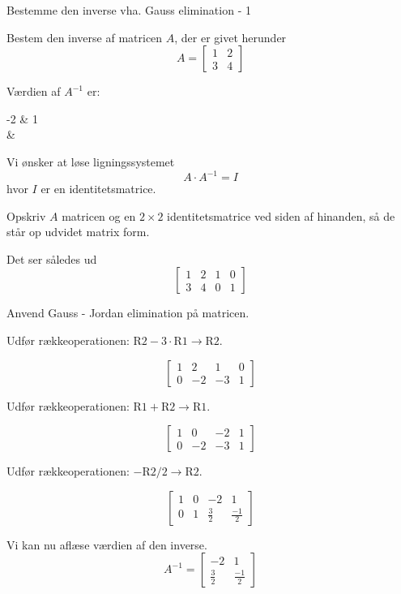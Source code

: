 \documentclass{article}
\begin{document}
\tableofcontents
\newpage

\begin{exercise}{Bestemme den inverse vha. Gauss elimination - 1}

Bestem den inverse af matricen $A$, der er givet herunder
\[
A = \left[\begin{array}{cc}
1 & 2 \\
3 & 4
\end{array} \right]
\]

Værdien af $A^{-1}$ er:
\begin{answermatrix}
-2 & 1 \\
 & 
\end{answermatrix}

\hint
Vi ønsker at løse ligningssystemet
\[
A \cdot A^{-1} = I
\]
hvor $I$ er en identitetsmatrice.

\hint
Opskriv $A$ matricen og en $2 \times 2$ identitetsmatrice
ved siden af hinanden, så de står op udvidet matrix form.

\hint
Det ser således ud
\[
\left[\begin{array}{cc|cc}
1 & 2 & 1 & 0 \\
3 & 4 & 0 & 1
\end{array} \right]
\]

\hint
Anvend Gauss - Jordan elimination på matricen.

\hint
Udfør rækkeoperationen: $\text{R2} - 3 \cdot \text{R1} \to \text{R2}$.

\hint
\[
\left[\begin{array}{cc|cc}
1 & 2 & 1 & 0 \\
0 & -2 & -3 & 1
\end{array} \right]
\]

\hint
Udfør rækkeoperationen: $\text{R1} + \text{R2} \to \text{R1}$.

\hint
\[
\left[\begin{array}{cc|cc}
1 & 0 & -2 & 1 \\
0 & -2 & -3 & 1
\end{array} \right]
\]

\hint
Udfør rækkeoperationen: $ - \text{R2}/2 \to \text{R2}$.

\hint
\[
\left[\begin{array}{cc|cc}
1 & 0 & -2 & 1 \\
0 & 1 & \frac{3}{2} & \frac{-1}{2}
\end{array} \right]
\]

\hint
Vi kan nu aflæse værdien af den inverse.
\[
A^{-1} = \left[\begin{array}{cc}
-2 & 1 \\
\frac{3}{2} & \frac{-1}{2}
\end{array} \right]
\]

\end{exercise}
\end{document}
